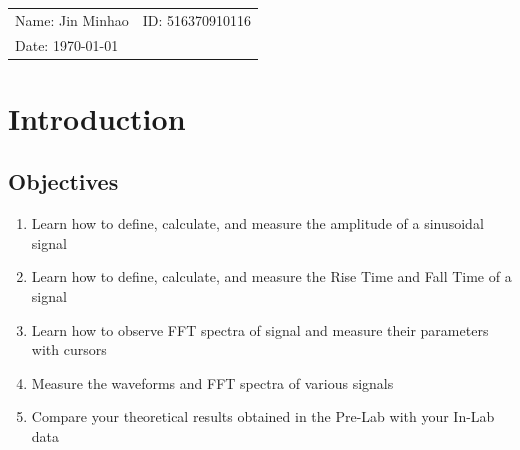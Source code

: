 \documentclass{article}
\begin{document}
\vspace*{0.25cm}
\hrulefill
\thispagestyle{empty}

\begin{center}
\begin{large}
\end{large}

\hrulefill

\vspace*{5cm}
\begin{Large}
\end{Large}

\vspace{2em}

\begin{large}
\end{large}
\end{center}


\vfill

\begin{table}[h!]
\flushleft
\begin{tabular}{ll}
Name: Jin Minhao \hspace*{2em}&
ID: 516370910116\hspace*{2em}\\





Date: \today

\end{tabular}
\end{table}


\newpage
\section{Introduction}
\subsection{Objectives}
\begin{enumerate}
\item Learn how to define, calculate, and measure the amplitude of a sinusoidal
signal
\item Learn how to define, calculate, and measure the Rise Time and Fall Time of a
signal
\item Learn how to observe FFT spectra of signal and measure their parameters with
cursors
\item Measure the waveforms and FFT spectra of various signals
\item Compare your theoretical results obtained in the Pre-Lab with your In-Lab
data
\end{enumerate}
\end{document}
